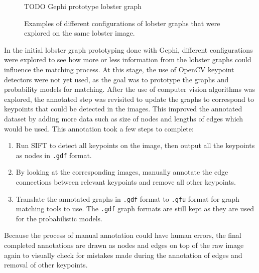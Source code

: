 \begin{figure}[H]
\centering
\begin{subfigure}{0.31\textwidth}

\end{subfigure}

\begin{subfigure}{0.31\textwidth}

\end{subfigure}

\begin{subfigure}{0.31\textwidth}

\end{subfigure}

TODO Gephi prototype lobster graph
\caption{Examples of different configurations of lobster graphs that were explored on the same lobster image.}
\end{figure}
\noindent
In the initial lobster graph prototyping done with Gephi, different configurations were explored to see how more or less information from the lobster graphs could influence the matching process. At this stage, the use of OpenCV keypoint detectors were not yet used, as the goal was to prototype the graphs and probability models for matching. 
\n
After the use of computer vision algorithms was explored, the annotated step was revisited to update the graphs to correspond to keypoints that could be detected in the images. This improved the annotated dataset by adding more data such as size of nodes and lengths of edges which would be used. This annotation took a few steps to complete:
\begin{enumerate}
\item Run SIFT to detect all keypoints on the image, then output all the keypoints as nodes in \texttt{.gdf} format.
\item By looking at the corresponding images, manually annotate the edge connections between relevant keypoints and remove all other keypoints.
\item Translate the annotated graphs in \texttt{.gdf} format to \texttt{.gfu} format for graph matching tools to use. The \texttt{.gdf} graph formats are still kept as they are used for the probabilistic models.
\end{enumerate}

\noindent
Because the process of manual annotation could have human errors, the final completed annotations are drawn as nodes and edges on top of the raw image again to visually check for mistakes made during the annotation of edges and removal of other keypoints.

